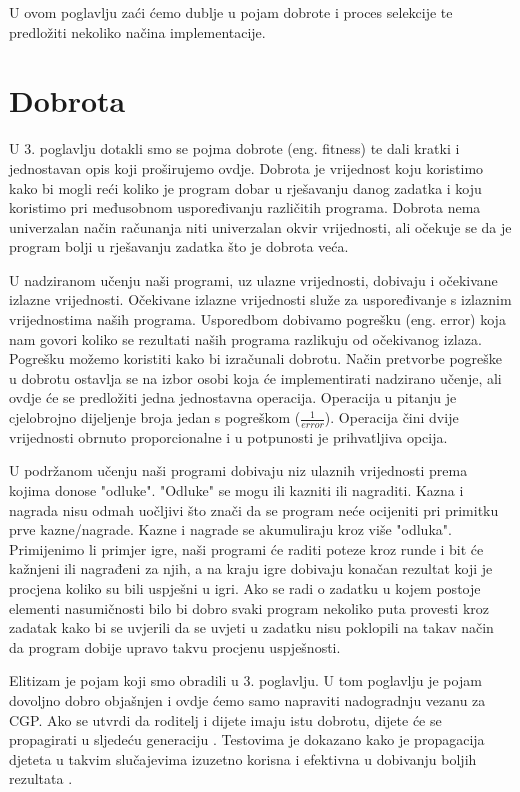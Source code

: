 \quad U ovom poglavlju zaći ćemo dublje u pojam dobrote i proces selekcije te predložiti nekoliko načina implementacije.

\section{Dobrota}
\quad U 3. poglavlju dotakli smo se pojma dobrote (eng. fitness) te dali kratki i jednostavan opis koji proširujemo ovdje. Dobrota je vrijednost koju koristimo kako bi mogli reći koliko je program dobar u rješavanju danog zadatka i koju koristimo pri međusobnom uspoređivanju različitih programa. Dobrota nema univerzalan način računanja niti univerzalan okvir vrijednosti, ali očekuje se da je program bolji u rješavanju zadatka što je dobrota veća.\par 
U nadziranom učenju naši programi, uz ulazne vrijednosti, dobivaju i očekivane izlazne vrijednosti. Očekivane izlazne vrijednosti služe za uspoređivanje s izlaznim vrijednostima naših programa. Usporedbom dobivamo pogrešku (eng. error) koja nam govori koliko se rezultati naših programa razlikuju od očekivanog izlaza. Pogrešku možemo koristiti kako bi izračunali dobrotu. Način pretvorbe pogreške u dobrotu ostavlja se na izbor osobi koja će implementirati nadzirano učenje, ali ovdje će se predložiti jedna jednostavna operacija. Operacija u pitanju je cjelobrojno dijeljenje broja jedan s pogreškom ($ \frac{1}{error} $). Operacija čini dvije vrijednosti obrnuto proporcionalne i u potpunosti je prihvatljiva opcija.\par 
U podržanom učenju naši programi dobivaju niz ulaznih vrijednosti prema kojima donose "odluke". "Odluke" se mogu ili kazniti ili nagraditi. Kazna i nagrada nisu odmah uočljivi što znači da se program neće ocijeniti pri primitku prve kazne/nagrade. Kazne i nagrade se akumuliraju kroz više "odluka". Primijenimo li primjer igre, naši programi će raditi poteze kroz runde i bit će kažnjeni ili nagrađeni za njih, a na kraju igre dobivaju konačan rezultat koji je procjena koliko su bili uspješni u igri. Ako se radi o zadatku u kojem postoje elementi nasumičnosti bilo bi dobro svaki program nekoliko puta provesti kroz zadatak kako bi se uvjerili da se uvjeti u zadatku nisu poklopili na takav način da program dobije upravo takvu procjenu uspješnosti.\par 
Elitizam je pojam koji smo obradili u 3. poglavlju. U tom poglavlju je pojam dovoljno dobro objašnjen i ovdje ćemo samo napraviti nadogradnju vezanu za CGP. Ako se utvrdi da roditelj i dijete imaju istu dobrotu, dijete će se propagirati u sljedeću generaciju \cite{CGPbook}\cite{CGPpresentation}. Testovima  je dokazano kako je propagacija djeteta u takvim slučajevima izuzetno korisna i efektivna u dobivanju boljih rezultata \cite{CGPbook}.
